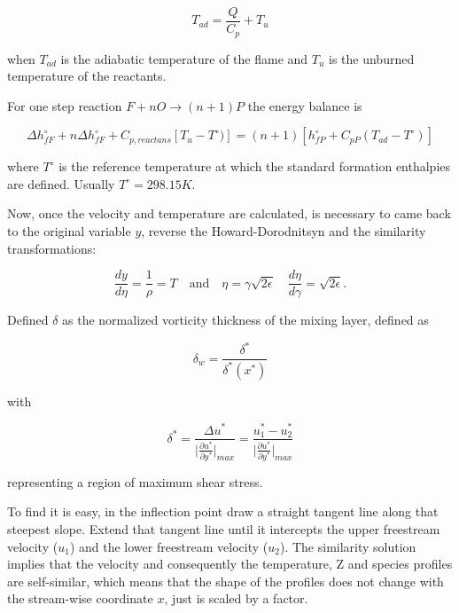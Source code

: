 \begin{equation}
    T_{ad}
    =
    \frac{Q}{C_p}+T_u
\end{equation}

when $T_{ad}$ is the adiabatic temperature of the flame and $T_u$ is the unburned temperature of the reactants. 

For one step reaction $F+nO\rightarrow (n+1)P$ the energy balance is 

\begin{equation*}
    \Delta h_{fF}^{\circ}
    +
    n
    \Delta h_{fF}^{\circ}
    +
    C_{p,reactans}
    [T_u-T^{\circ})]
    =(n+1)[h_{fP}^{\circ}+C_{pP}(T_{ad}-T^{\circ})]
\end{equation*}

where $T^{\circ}$ is the reference temperature at which the standard formation
enthalpies are defined. Usually $T^{\circ}=298.15 K$. 

Now, once the velocity and temperature are calculated, is necessary  
to came back to the original variable $y$, reverse the Howard-Dorodnitsyn and the similarity 
transformations: 

\begin{equation*}
   \frac{dy}{d\eta}
   =
   \frac{1}{\rho}
   =
   T
   \quad
   \text{and}
   \quad
  \eta
  =
  \gamma 
   \sqrt{2\epsilon}
   \quad
  \frac{d\eta}{d\gamma}
  =
   \sqrt{2\epsilon}
   .
\end{equation*}

Defined
$\delta$ as  the normalized vorticity thickness of the mixing layer, defined as 

\begin{equation*}
\delta_w=\frac{\delta^*}{\delta^*(x^*)}
\end{equation*}

with

\begin{equation*}
  \delta^*=\frac{\Delta u^*}{\big|\frac{\partial u^* }{\partial y^*}\big|_{max}}
 =
 \frac{u_1^*-u_2^*}{\big|\frac{\partial u^* }{\partial y^*}\big|_{max}}
\end{equation*}

representing a region of maximum shear stress. 


To find it is easy, in the inflection point draw a
straight tangent line along that steepest slope. Extend that tangent line until
it intercepts the upper freestream velocity ($u_1$) and the lower freestream
velocity ($u_2$).
The similarity solution implies that the velocity and consequently the
temperature, Z and species profiles are self-similar, which means 
that the shape of the profiles does not change with the stream-wise coordinate $x$, 
just is scaled by a factor. 


